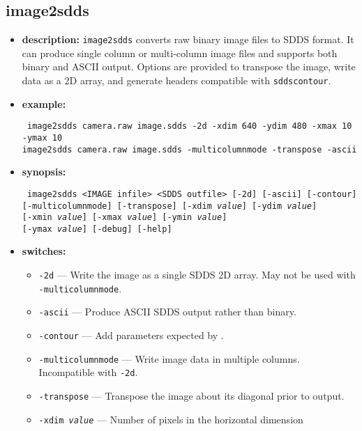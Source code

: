 %
\newpage
\subsection{image2sdds}
\label{image2sdds}

\begin{itemize}
\item {\bf description:} \verb|image2sdds| converts raw binary image files to SDDS format. It can
  produce single column or multi-column image files and supports both
  binary and ASCII output.  Options are provided to transpose the image,
  write data as a 2D array, and generate headers compatible with
  \verb|sddscontour|.
\item {\bf example:}
\begin{flushleft}{\tt
image2sdds camera.raw image.sdds -2d -xdim 640 -ydim 480 -xmax 10 -ymax 10\\
image2sdds camera.raw image.sdds -multicolumnmode -transpose -ascii
}\end{flushleft}
\item {\bf synopsis:}
\begin{flushleft}{\tt
image2sdds <IMAGE infile> <SDDS outfile> [-2d] [-ascii] [-contour]\\
    {}[-multicolumnmode] [-transpose] [-xdim {\em value}] [-ydim {\em value}]\\
    {}[-xmin {\em value}] [-xmax {\em value}] [-ymin {\em value}]\\
    {}[-ymax {\em value}] [-debug] [-help]
}\end{flushleft}
\item {\bf switches:}
  \begin{itemize}
  \item {\tt -2d} --- Write the image as a single SDDS 2D array. May not be used
    with \verb|-multicolumnmode|.
  \item {\tt -ascii} --- Produce ASCII SDDS output rather than binary.
  \item {\tt -contour} --- Add parameters expected by .
  \item {\tt -multicolumnmode} --- Write image data in multiple columns. Incompatible
    with \verb|-2d|.
  \item {\tt -transpose} --- Transpose the image about its diagonal prior to output.
  \item {\tt -xdim {\em value}} --- Number of pixels in the horizontal dimension

\end{itemize}
\end{itemize}
